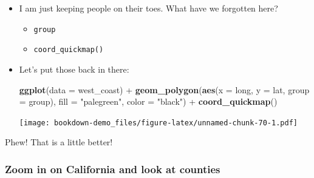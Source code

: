 \documentclass[]{book}
\newenvironment{Shaded}{\begin{snugshade}}{\end{snugshade}}
\newcommand{\KeywordTok}[1]{\textcolor[rgb]{0.13,0.29,0.53}{\textbf{{#1}}}}
\newcommand{\DataTypeTok}[1]{\textcolor[rgb]{0.13,0.29,0.53}{{#1}}}
\newcommand{\StringTok}[1]{\textcolor[rgb]{0.31,0.60,0.02}{{#1}}}
\newcommand{\NormalTok}[1]{{#1}}
\providecommand{\tightlist}{%
  \setlength{\itemsep}{0pt}\setlength{\parskip}{0pt}}
\theoremstyle{definition}
\theoremstyle{definition}
\theoremstyle{remark}
\begin{document}
\begin{itemize}
\item
  I am just keeping people on their toes. What have we forgotten here?

  \begin{itemize}
  \tightlist
  \item
    \texttt{group}
  \item
    \texttt{coord\_quickmap()}
  \end{itemize}
\item
  Let's put those back in there:

\begin{Shaded}
\begin{Highlighting}[]
\KeywordTok{ggplot}\NormalTok{(}\DataTypeTok{data =} \NormalTok{west_coast) +}\StringTok{ }
\StringTok{  }\KeywordTok{geom_polygon}\NormalTok{(}\KeywordTok{aes}\NormalTok{(}\DataTypeTok{x =} \NormalTok{long, }\DataTypeTok{y =} \NormalTok{lat, }\DataTypeTok{group =} \NormalTok{group), }\DataTypeTok{fill =} \StringTok{"palegreen"}\NormalTok{, }\DataTypeTok{color =} \StringTok{"black"}\NormalTok{) +}\StringTok{ }
\StringTok{  }\KeywordTok{coord_quickmap}\NormalTok{()}
\end{Highlighting}
\end{Shaded}

  \texttt{[image: bookdown-demo\_files/figure-latex/unnamed-chunk-70-1.pdf]}
\end{itemize}

Phew! That is a little better!

\subsubsection{Zoom in on California and look at
counties}\label{zoom-in-on-california-and-look-at-counties}
\end{document}
